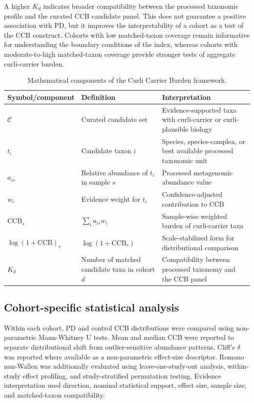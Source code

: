 \documentclass[11pt]{article}
\newcommand{\CCB}{\mathrm{CCB}}
\newcommand{\logCCB}{\log(1+\mathrm{CCB})}
\begin{document}
A higher $K_d$ indicates broader compatibility between the processed taxonomic profile and the curated CCB candidate panel. This does not guarantee a positive association with PD, but it improves the interpretability of a cohort as a test of the CCB construct. Cohorts with low matched-taxon coverage remain informative for understanding the boundary conditions of the index, whereas cohorts with moderate-to-high matched-taxon coverage provide stronger tests of aggregate curli-carrier burden.

\begin{table}[H]
\centering
\caption{Mathematical components of the Curli Carrier Burden framework.}
\label{tab:math}
\small
\begin{tabularx}{\textwidth}{l l X}
\toprule
Symbol/component & Definition & Interpretation \\
\midrule
$\mathcal{C}$ & Curated candidate set & Evidence-supported taxa with curli-carrier or curli-plausible biology \\
$t_i$ & Candidate taxon $i$ & Species, species-complex, or best available processed taxonomic unit \\
$a_{is}$ & Relative abundance of $t_i$ in sample $s$ & Processed metagenomic abundance value \\
$w_i$ & Evidence weight for $t_i$ & Confidence-adjusted contribution to CCB \\
$\CCB_s$ & $\sum_i a_{is}w_i$ & Sample-wise weighted burden of curli-carrier taxa \\
$\logCCB_s$ & $\log(1+\CCB_s)$ & Scale-stabilized form for distributional comparison \\
$K_d$ & Number of matched candidate taxa in cohort $d$ & Compatibility between processed taxonomy and the CCB panel \\
\bottomrule
\end{tabularx}
\end{table}

\subsection*{Cohort-specific statistical analysis}

Within each cohort, PD and control CCB distributions were compared using non-parametric Mann-Whitney U tests. Mean and median CCB were reported to separate distributional shift from outlier-sensitive abundance patterns. Cliff's $\delta$ was reported where available as a non-parametric effect-size descriptor. Romano non-Wallen was additionally evaluated using leave-one-study-out analysis, within-study effect profiling, and study-stratified permutation testing. Evidence interpretation used direction, nominal statistical support, effect size, sample size, and matched-taxon compatibility.
\end{document}
